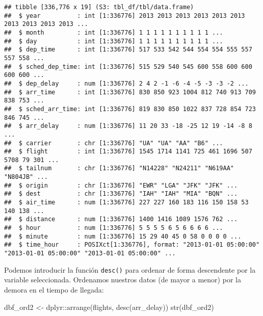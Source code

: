 \documentclass[
]{book}
\newenvironment{Shaded}{\begin{snugshade}}{\end{snugshade}}
\newcommand{\FunctionTok}[1]{\textcolor[rgb]{0.00,0.00,0.00}{#1}}
\newcommand{\NormalTok}[1]{#1}
\newcommand{\OtherTok}[1]{\textcolor[rgb]{0.56,0.35,0.01}{#1}}
\newcommand{\SpecialCharTok}[1]{\textcolor[rgb]{0.00,0.00,0.00}{#1}}
\begin{document}
\begin{verbatim}
## tibble [336,776 x 19] (S3: tbl_df/tbl/data.frame)
##  $ year          : int [1:336776] 2013 2013 2013 2013 2013 2013 2013 2013 2013 2013 ...
##  $ month         : int [1:336776] 1 1 1 1 1 1 1 1 1 1 ...
##  $ day           : int [1:336776] 1 1 1 1 1 1 1 1 1 1 ...
##  $ dep_time      : int [1:336776] 517 533 542 544 554 554 555 557 557 558 ...
##  $ sched_dep_time: int [1:336776] 515 529 540 545 600 558 600 600 600 600 ...
##  $ dep_delay     : num [1:336776] 2 4 2 -1 -6 -4 -5 -3 -3 -2 ...
##  $ arr_time      : int [1:336776] 830 850 923 1004 812 740 913 709 838 753 ...
##  $ sched_arr_time: int [1:336776] 819 830 850 1022 837 728 854 723 846 745 ...
##  $ arr_delay     : num [1:336776] 11 20 33 -18 -25 12 19 -14 -8 8 ...
##  $ carrier       : chr [1:336776] "UA" "UA" "AA" "B6" ...
##  $ flight        : int [1:336776] 1545 1714 1141 725 461 1696 507 5708 79 301 ...
##  $ tailnum       : chr [1:336776] "N14228" "N24211" "N619AA" "N804JB" ...
##  $ origin        : chr [1:336776] "EWR" "LGA" "JFK" "JFK" ...
##  $ dest          : chr [1:336776] "IAH" "IAH" "MIA" "BQN" ...
##  $ air_time      : num [1:336776] 227 227 160 183 116 150 158 53 140 138 ...
##  $ distance      : num [1:336776] 1400 1416 1089 1576 762 ...
##  $ hour          : num [1:336776] 5 5 5 5 6 5 6 6 6 6 ...
##  $ minute        : num [1:336776] 15 29 40 45 0 58 0 0 0 0 ...
##  $ time_hour     : POSIXct[1:336776], format: "2013-01-01 05:00:00" "2013-01-01 05:00:00" "2013-01-01 05:00:00" ...
\end{verbatim}

Podemos introducir la función \texttt{desc()} para ordenar de forma descendente por la variable seleccionada. Ordenamos nuestros datos (de mayor a menor) por la demora en el tiempo de llegada:

\begin{Shaded}
\begin{Highlighting}[]
\NormalTok{dbf\_ord2 }\OtherTok{\textless{}{-}}\NormalTok{ dplyr}\SpecialCharTok{::}\FunctionTok{arrange}\NormalTok{(flights, }\FunctionTok{desc}\NormalTok{(arr\_delay))}
\FunctionTok{str}\NormalTok{(dbf\_ord2)}
\end{Highlighting}
\end{Shaded}
\end{document}
